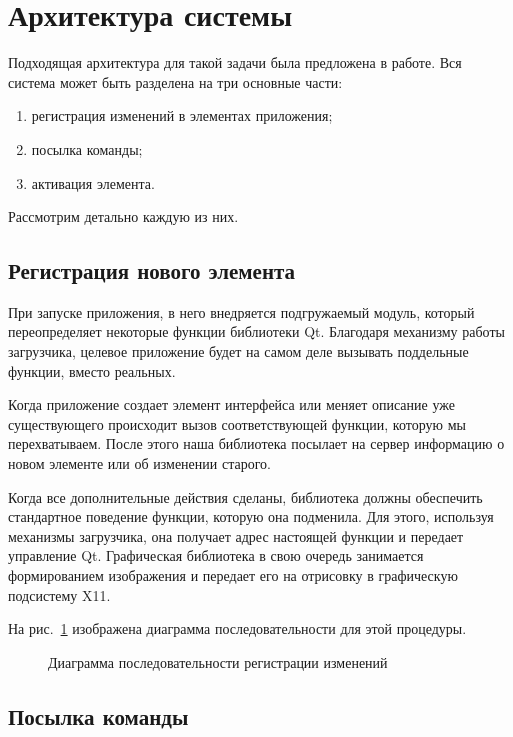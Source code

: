 \section{Архитектура системы}

Подходящая архитектура для такой задачи была предложена в
работе\cite{polshakovinject}. Вся система может быть разделена на три основные
части:

\begin{enumerate}
    \item регистрация изменений в элементах приложения;
    \item посылка команды;
    \item активация элемента.
\end{enumerate}

Рассмотрим детально каждую из них.

\subsection{Регистрация нового элемента}

При запуске приложения, в него внедряется подгружаемый модуль, который
переопределяет некоторые функции библиотеки Qt. Благодаря механизму работы
загрузчика, целевое приложение будет на самом деле вызывать поддельные
функции, вместо реальных.

Когда приложение создает элемент интерфейса или меняет описание уже
существующего происходит вызов соответствующей функции, которую мы
перехватываем. После этого наша библиотека посылает на сервер информацию
о новом элементе или об изменении старого.

Когда все дополнительные действия сделаны, библиотека должны обеспечить
стандартное поведение функции, которую она подменила. Для этого, используя
механизмы загрузчика, она получает адрес настоящей функции и передает
управление Qt. Графическая библиотека в свою очередь занимается формированием
изображения и передает его на отрисовку в графическую подсистему X11.

На рис.~\ref{fig:create-elem} изображена диаграмма последовательности для
этой процедуры.

\begin{figure}[h]
	\centering
	
	\caption{Диаграмма последовательности регистрации
		изменений}\label{fig:create-elem}
\end{figure}

\subsection{Посылка команды}

